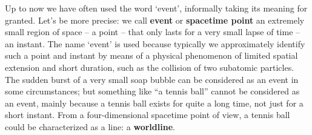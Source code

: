 \documentclass[a4paper,12pt,%
onecolumn,oneside,titlepage,%
british%
]{memoir}
\renewcommand*{\|}[1][]{\nonscript\:#1\vert\nonscript\:\mathopen{}}
\begin{document}
Up to now we have often used the word \enquote*{event}, informally taking its meaning for granted. Let's be more precise: we call \textbf{event} or \textbf{spacetime point} an extremely small region of space -- a point -- that only lasts for a very small lapse of time -- an instant. The name \enquote*{event} is used because typically we approximately identify such a point and instant by means of a physical phenomenon of limited spatial extension and short duration, such as the collision of two subatomic particles. The sudden burst of a very small soap bubble can be considered as an event in some circumstances; but something like \enquote{a tennis ball} cannot be considered as an event, mainly because a tennis ball exists for quite a long time, not just for a short instant. From a four-dimensional spacetime point of view,
%
%
a tennis ball could be characterized as a line: a \textbf{worldline}.
\end{document}
